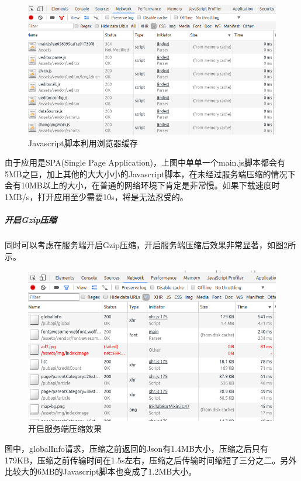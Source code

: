 \documentclass[letter]{book}
\begin{document}
\begin{figure}[htbp]
	\centering
	\includegraphics[scale=0.45]{scriptusingdiskcache.png}
	\caption{Javascript脚本利用浏览器缓存}
	\label{fig:scriptusingdiskcache}
\end{figure}

由于应用是SPA(Single Page Application)，上图中单单一个main.js脚本都会有5MB之巨，加上其他的大大小小的Javascript脚本，在未经过服务端压缩的情况下会有10MB以上的大小，在普通的网络环境下肯定是非常慢。如果下载速度时1MB/s，打开应用至少需要10s，将是无法忍受的。

\subparagraph{开启Gzip压缩}

同时可以考虑在服务端开启Gzip压缩，开启服务端压缩后效果非常显著，如图\ref{fig:openservercompress}所示。

\begin{figure}[htbp]
	\centering
	\includegraphics[scale=0.5]{openservercompress.png}
	\caption{开启服务端压缩效果}
	\label{fig:openservercompress}
\end{figure}

图中，globalInfo请求，压缩之前返回的Json有1.4MB大小，压缩之后只有179KB，压缩之前传输时间在1.5s左右，压缩之后传输时间缩短了三分之二。另外比较大的6MB的Javascript脚本也变成了1.2MB大小。
\end{document}
